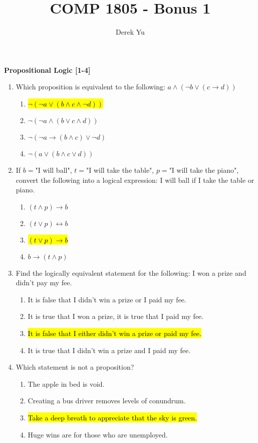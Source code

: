 \documentclass{article}
\renewcommand{\implies}{\rightarrow}
\begin{document}

\title{COMP 1805 - Bonus 1}
\author{Derek Yu}
\date{} %
\maketitle
\thispagestyle{fancy}

\textbf{Propositional Logic [1-4]}
\begin{enumerate}

\item Which proposition is equivalent to the following: $a\land (\neg b\lor(c\implies d))$
\begin{enumerate}
\item \hl{$\neg(\neg a\lor (b\land c\land \neg d))$}
\item $\neg(\neg a\land (b\lor c\land d))$
\item $\neg(\neg a\implies (b\land c)\lor \neg d)$
\item $\neg (a\lor (b\land c\lor d))$
\end{enumerate}

\item If $b=$"I will ball", $t=$"I will take the table", $p=$"I will take the piano", convert the following into a logical expression: I will ball if I take the table or piano.
\begin{enumerate}
\item {$(t\land p)\implies b$}
\item {$(t\lor p)\leftrightarrow b$}
\item \hl{$(t\lor p)\implies b$}
\item {$b\implies(t\land p)$}
\end{enumerate}

\item Find the logically equivalent statement for the following: I won a prize and didn't pay my fee.
\begin{enumerate}
\item It is false that I didn't win a prize or I paid my fee.
\item It is true that I won a prize, it is true that I paid my fee.
\item \hl{It is false that I either didn't win a prize or paid my fee.}
\item It is true that I didn't win a prize and I paid my fee.
\end{enumerate}

\item Which statement is not a proposition?
\begin{enumerate}
\item The apple in bed is void.
\item Creating a bus driver removes levels of conundrum.
\item \hl{Take a deep breath to appreciate that the sky is green.}
\item Huge wins are for those who are unemployed.
\end{enumerate}


\end{enumerate}
\end{document}
